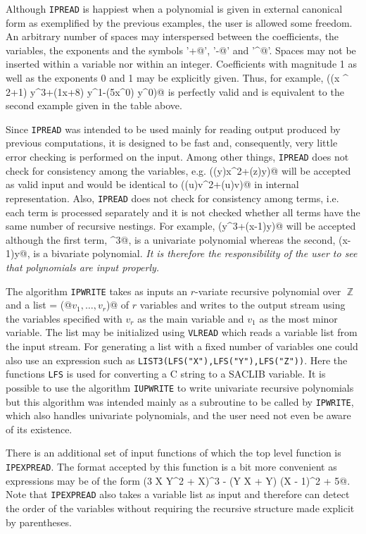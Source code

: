 Although {\tt IPREAD} is happiest when a polynomial is given in
external canonical form as exemplified by the previous examples, the
user is allowed some freedom.  An arbitrary number of spaces may
interspersed between the coefficients, the variables, the exponents
and the symbols '\verb@+@', '\verb@-@' and '\verb@^@'.  Spaces may not
be inserted within a variable nor within an integer.  Coefficients
with magnitude 1 as well as the exponents 0 and 1 may be explicitly
given. Thus, for example, \verb@((x ^ 2+1) y^3+(1x+8) y^1-(5x^0) y^0)@
is perfectly valid and is equivalent to the second example given in
the table above.

Since {\tt IPREAD} was intended to be used mainly for reading output
produced by previous computations, it is designed to be fast and,
consequently, very little error checking is performed on the input.
Among other things, {\tt IPREAD} does not check for consistency among
the variables, e.g. \verb@((y)x^2+(z)y)@ will be accepted as valid
input and would be identical to
\verb@((u)v^2+(u)v)@ in internal representation.  Also, {\tt IPREAD}
does not check for consistency among terms, i.e.  each term is
processed separately and it is not checked whether all terms have the
same number of recursive nestings.  For example, \verb@(y^3+(x-1)y)@
will be accepted although the first term, \verb@y^3@, is a univariate
polynomial whereas the second,
\verb@(x-1)y@, is a bivariate polynomial.  {\em It is therefore the
responsibility of the user to see that polynomials are input properly.}

The algorithm {\tt IPWRITE} takes as inputs an $r$-variate recursive
polynomial \verb@A@ over $\BbbZ$ and a list
\verb@V = (@$v_1,\ldots,v_r$\verb@)@ of $r$ variables and writes \verb@A@ to
the output stream using the variables specified with $v_r$ as the main
variable and $v_1$ as the most minor variable.  The list \verb@V@ may be
initialized using {\tt VLREAD} which reads a variable list from the input
stream.  For generating a list with a fixed number of variables one could also
use an expression such as {\tt LIST3(LFS("X"),LFS("Y"),LFS("Z"))}.  Here the
functions {\tt LFS} is used for converting a C string to a SACLIB variable.
It is possible to use the algorithm {\tt IUPWRITE} to write univariate
recursive polynomials but this algorithm was intended mainly as a subroutine
to be called by {\tt IPWRITE}, which also handles univariate polynomials, and
the user need not even be aware of its existence.

There is an additional set of input functions of which the top level function
is {\tt IPEXPREAD}. The format accepted by this function is a bit more
convenient as expressions may be of the form 
\verb@(3 X Y^2 + X)^3 - (Y X + Y) (X - 1)^2 + 5@.
Note that {\tt IPEXPREAD} also takes a variable list as input and therefore
can detect the order of the variables without requiring the recursive
structure made explicit by parentheses.

